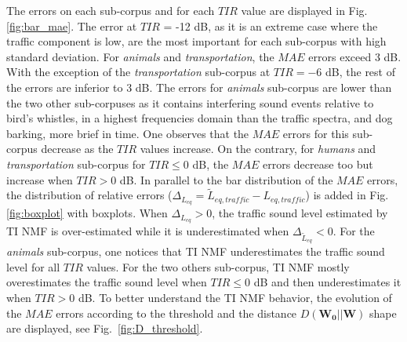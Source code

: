 \documentclass[12pt,english,twoside]{article}
\begin{document}
The errors on each sub-corpus and for each $TIR$ value are displayed in Fig. \ref{fig:bar_mae}.
The error at $TIR$ = -12 dB, as it is an extreme case where the traffic component is low, are the most important for each sub-corpus with high standard deviation. For \textit{animals} and \textit{transportation}, the $MAE$ errors exceed 3 dB. With the exception of the \textit{transportation} sub-corpus at $TIR = -6$ dB, the rest of the errors are inferior to 3 dB.
The errors for \textit{animals} sub-corpus are lower than the two other sub-corpuses as it contains interfering sound events relative to bird's whistles, in a highest frequencies domain than the traffic spectra, and dog barking, more brief in time.
One observes that the $MAE$ errors for this sub-corpus decrease as the $TIR$ values increase. On the contrary, for \textit{humans} and \textit{transportation} sub-corpus for $TIR \leq 0$ dB, the $MAE$ errors decrease too but increase when $TIR > 0$ dB.
In parallel to the bar distribution of the $MAE$ errors, the distribution of relative errors ($\Delta_{L_{eq}} = \tilde{L}_{eq,traffic}-L_{eq,traffic}$) is added in Fig. \ref{fig:boxplot} with boxplots. When $\Delta_{L_{eq}} > 0$, the traffic sound level estimated by TI NMF is over-estimated while it is underestimated when $\Delta_{\tilde{L}_{eq}} < 0$.
For the \textit{animals} sub-corpus, one notices that TI NMF underestimates the traffic sound level for all $TIR$ values. For the two others sub-corpus, TI NMF mostly  overestimates the traffic sound level when $TIR \leq 0$ dB and then underestimates it when $TIR > 0$ dB.
To better understand the TI NMF behavior, the evolution of the $MAE$ errors according to the threshold and the distance $D(\mathbf{W_0}\vert \vert \mathbf{W})$ shape are displayed, see Fig.~\ref{fig:D_threshold}.
\end{document}
